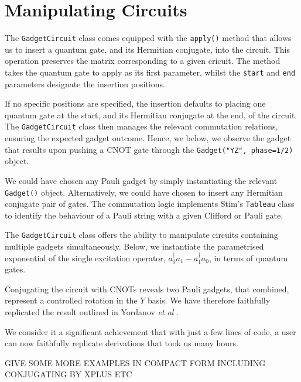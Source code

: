 \section{Manipulating Circuits}

The \lstinline{GadgetCircuit} class comes equipped with the \lstinline{apply()} method that allows us to insert a quantum gate, and its Hermitian conjugate, into the circuit. This operation preserves the matrix corresponding to a given cricuit. The method takes the quantum gate to apply as its first parameter, whilst the \lstinline{start} and \lstinline{end} parameters designate the insertion positions.


If no specific positions are specified, the insertion defaults to placing one quantum gate at the start, and its Hermitian conjugate at the end, of the circuit. The \lstinline{GadgetCircuit} class then manages the relevant commutation relations, ensuring the expected gadget outcome. Hence, we below, we observe the gadget that results upon pushing a CNOT gate through the \lstinline{Gadget("YZ", phase=1/2)} object.


We could have chosen any Pauli gadget by simply instantiating the relevant \lstinline{Gadget()} object. Alternatively, we could have chosen to insert any Hermitian conjugate pair of gates. The commutation logic implements Stim's \lstinline{Tableau} class to identify the behaviour of a Pauli string with a given Clifford or Pauli gate.


The \lstinline{GadgetCircuit} class offers the ability to manipulate circuits containing multiple gadgets simultaneously. Below, we instantiate the parametrised exponential of the single excitation operator, $a^\dagger_0 a_1 - a^\dagger_1 a_0$, in terms of quantum gates.


Conjugating the circuit with CNOTs reveals two Pauli gadgets, that combined, represent a controlled rotation in the $Y$ basis. We have therefore faithfully replicated the result outlined in Yordanov \textit{et al} \cite{Yordanov2020}.


We consider it a significant achievement that with just a few lines of code, a user can now faithfully replicate derivations that took us many hours.

GIVE SOME MORE EXAMPLES IN COMPACT FORM INCLUDING CONJUGATING BY XPLUS ETC

